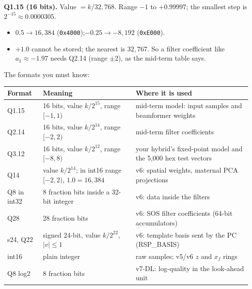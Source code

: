 \documentclass[11pt]{article}
\begin{document}
\begin{center}
\end{center}

\textbf{Q1.15 (16 bits).} Value $= k/32{,}768$. Range $-1$ to $+0.99997$; the smallest step is $2^{-15}\approx 0.0000305$.
\begin{itemize}
  \item $0.5 \to 16{,}384$ (\texttt{0x4000});\quad $-0.25 \to -8{,}192$ (\texttt{0xE000}).
  \item $+1.0$ cannot be stored; the nearest is $32{,}767$. So a filter coefficient like $a_1 \approx -1.97$ needs Q2.14 (range $\pm 2$), as the mid-term table says.
\end{itemize}

The formats you must know:

\begin{center}
\small
\begin{tabularx}{\linewidth}{@{}l l X@{}}
\toprule
\textbf{Format} & \textbf{Meaning} & \textbf{Where it is used} \\
\midrule
Q1.15 & 16 bits, value $k/2^{15}$, range $[-1,1)$ & mid-term model: input samples and beamformer weights \\
Q2.14 & 16 bits, value $k/2^{14}$, range $[-2,2)$ & mid-term filter coefficients \\
Q3.12 & 16 bits, value $k/2^{12}$, range $[-8,8)$ & your hybrid's fixed-point model and the 5,000 hex test vectors \\
Q14 & value $k/2^{14}$; in int16 range $[-2,2)$, $1.0 = 16{,}384$ & v6: spatial weights, maternal PCA projections \\
Q8 in int32 & 8 fraction bits inside a 32-bit integer & v6: data inside the filters \\
Q28 & 28 fraction bits & v6: SOS filter coefficients (64-bit accumulators) \\
s24, Q22 & signed 24-bit, value $k/2^{22}$, $|v|\le 1$ & v6: template basis sent by the PC (RSP\_BASIS) \\
int16 & plain integer & raw samples; v5/v6 $z$ and $x_f$ rings \\
Q8 log2 & 8 fraction bits & v7-DL: log-quality in the look-ahead unit \\
\bottomrule
\end{tabularx}
\end{center}
\end{document}
